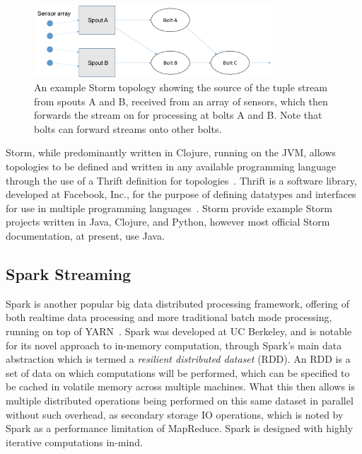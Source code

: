 \begin{figure}[ht]
  \centering
  \includegraphics[width=0.8\textwidth]{includes/figures/fig_storm_topology1}
  \caption{An example Storm topology showing the source of the tuple stream from spouts A and B, received from an array
  of sensors, which then forwards the stream on for processing at bolts A and B. Note that bolts can forward streams
  onto other bolts.}
  \label{fig:storm_topology}
\end{figure}

Storm, while predominantly written in Clojure, running on the JVM, allows topologies to be defined and written in any
available programming language through the use of a Thrift definition for topologies~\cite{About8:online}. Thrift is
a software library, developed at Facebook, Inc., for the purpose of defining datatypes and interfaces for use in
multiple programming languages~\cite{slee2007thrift}. Storm provide example Storm projects written in Java, Clojure,
and Python, however most official Storm documentation, at present, use Java.



\subsection{Spark Streaming} %
\label{ssub:spark_streaming}

Spark is another popular big data distributed processing framework, offering of both realtime data processing
and more traditional batch mode processing, running on top of YARN~\cite{zaharia2010spark}. Spark was developed at UC
Berkeley, and is notable for its novel approach to in-memory computation, through Spark's main data abstraction which is
termed a \textit{resilient distributed dataset} (RDD). An RDD is a set of data on which computations will be performed,
which can be specified to be cached in volatile memory across multiple machines. What this then allows is multiple
distributed operations being performed on this same dataset in parallel without such overhead, as secondary storage
IO operations, which is noted by Spark as a performance limitation of MapReduce. Spark is designed with highly iterative
computations in-mind.

